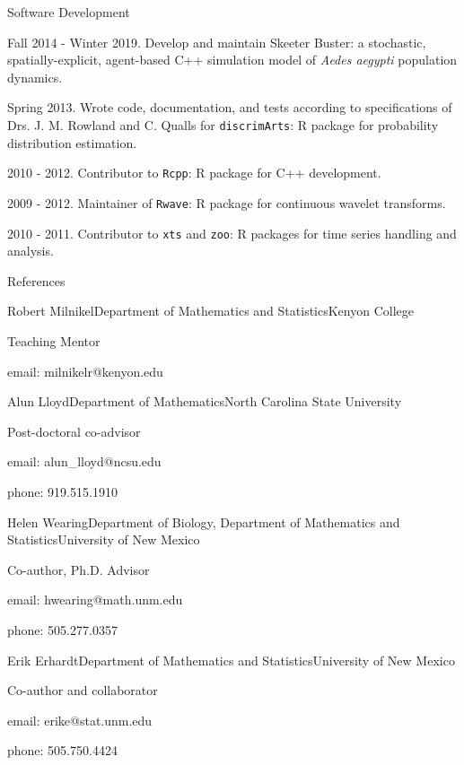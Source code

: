 \documentclass{resume} %
\begin{document}
\clearpage
\begin{rSection}{Software Development}
\item Fall 2014 - Winter 2019. Develop and maintain Skeeter Buster: a stochastic,
spatially-explicit, agent-based C++ simulation model of {\em Aedes aegypti}
population dynamics.
\item Spring 2013. Wrote code, documentation, and tests according to
specifications of Drs. J. M. Rowland and C. Qualls for \texttt{discrimArts}: R package for probability
distribution estimation.
\item 2010 - 2012. Contributor to \texttt{Rcpp}: R package for C++ development.
\item 2009 - 2012. Maintainer of \texttt{Rwave}: R package for continuous wavelet transforms.
\item 2010 - 2011. Contributor to \texttt{xts} and \texttt{zoo}: R packages for time series handling and analysis.
\end{rSection}

\begin{rSection}{References}
\begin{rSubsection}{Robert Milnikel}{}{Department of Mathematics and Statistics}{Kenyon College}
\item Teaching Mentor
\item email: milnikelr@kenyon.edu
\end{rSubsection}
\begin{rSubsection}{Alun Lloyd}{}{Department of Mathematics}{North Carolina State University}
\item Post-doctoral co-advisor
\item email: alun\_lloyd@ncsu.edu
\item phone:  919.515.1910
\end{rSubsection}
\begin{rSubsection}{Helen Wearing}{}{Department of Biology, Department of Mathematics and Statistics}{University of New Mexico}
\item Co-author, Ph.D. Advisor
\item email: hwearing@math.unm.edu
\item phone: 505.277.0357
\end{rSubsection}
\begin{rSubsection}{Erik Erhardt}{}{Department of Mathematics and Statistics}{University of New Mexico}
\item Co-author and collaborator
\item email: erike@stat.unm.edu
\item phone: 505.750.4424
\end{rSubsection}
\end{rSection}
\end{document}
